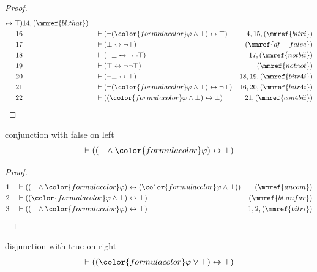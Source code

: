 \begin{proof}
\begin{align}
      \leftrightarrow \top )&14,(\mmref{bl.that})\notag
  \\ 16 && & \vdash ( \lnot ( {\color{formulacolor}\varphi} \wedge \bot )
      \leftrightarrow \top )&4,15,(\mmref{bitri})\notag
  \\ 17 && & \vdash ( \bot \leftrightarrow \lnot \top
      )&(\mmref{df-false})\notag
  \\ 18 && & \vdash ( \lnot \bot \leftrightarrow \lnot \lnot \top
      )&17,(\mmref{notbii})\notag
  \\ 19 && & \vdash ( \top \leftrightarrow \lnot \lnot \top
      )&(\mmref{notnot})\notag
  \\ 20 && & \vdash ( \lnot \bot \leftrightarrow \top
      )&18,19,(\mmref{bitr4i})\notag
  \\ 21 && & \vdash ( \lnot ( {\color{formulacolor}\varphi} \wedge \bot )
      \leftrightarrow \lnot \bot
      )&16,20,(\mmref{bitr4i})\notag
  \\ 22 && & \vdash ( ( {\color{formulacolor}\varphi} \wedge \bot )
      \leftrightarrow \bot )&21,(\mmref{con4bii})\notag
\end{align}
\end{proof}

\begin{lemma} conjunction with false  on left
\begin{align}
\vdash ( ( \bot \wedge {\color{formulacolor}\varphi} ) \leftrightarrow \bot
    )\label{bl.anfal}
\end{align}
\end{lemma}

\begin{proof}
\begin{align}
  1 && & \vdash ( ( \bot \wedge {\color{formulacolor}\varphi} ) \leftrightarrow
      ( {\color{formulacolor}\varphi} \wedge \bot )
      )&(\mmref{ancom})\notag
  \\ 2 && & \vdash ( ( {\color{formulacolor}\varphi} \wedge \bot )
      \leftrightarrow \bot )&(\mmref{bl.anfar})\notag
  \\ 3 && & \vdash ( ( \bot \wedge {\color{formulacolor}\varphi} )
      \leftrightarrow \bot )&1,2,(\mmref{bitri})\notag
\end{align}
\end{proof}

\begin{lemma} disjunction with true  on right
\begin{align}
\vdash ( ( {\color{formulacolor}\varphi} \vee \top ) \leftrightarrow \top
    )\label{bl.ortrr}
\end{align}
\end{lemma}

